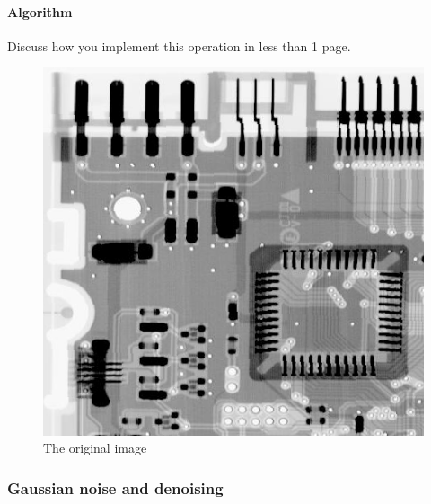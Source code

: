 \documentclass{article}
\begin{document}
\paragraph{Algorithm}
Discuss how you implement this operation in less than 1 page.

\begin{figure}[]
	\centering
	\includegraphics[width=336pt]{../img/task_2.png}
	\caption{The original image}
\end{figure}

\subsubsection{Gaussian noise and denoising}
\end{document}
